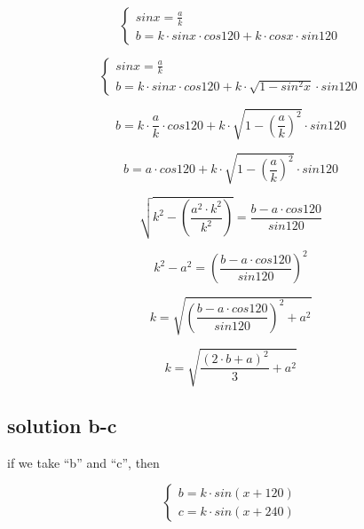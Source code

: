 \documentclass[unicode, 12pt, a4paper]{article}
\begin{document}
\begin{equation}
  \begin{cases}
    sin x = \frac{a}{k}\\
    b = k \cdot sin x \cdot cos 120 + k \cdot cos x \cdot sin 120
  \end{cases}
\end{equation}


\begin{equation}
  \begin{cases}
    sin x = \frac{a}{k}\\
    b = k \cdot sin x \cdot cos 120 + k \cdot \sqrt{1 - sin^2 x} \cdot sin 120
  \end{cases}
\end{equation}


\begin{equation}
  b = k \cdot \frac{a}{k} \cdot cos 120 + k \cdot \sqrt{1 - \left(\frac{a}{k}\right)^2} \cdot sin 120
\end{equation}

\begin{equation}
  b = a \cdot cos 120 + k \cdot \sqrt{1 - \left(\frac{a}{k}\right)^2} \cdot sin 120
\end{equation}

\begin{equation}
  \sqrt{k^2 - \left(\frac{a^2 \cdot k^2}{k^2}\right)} =  \frac{b - a \cdot cos 120}{sin 120}
\end{equation}

\begin{equation}
  k^2 - a^2  =  \left(\frac{b - a \cdot cos 120}{sin 120}\right)^2
\end{equation}

\begin{equation}
  k = \sqrt{\left(\frac{b - a \cdot cos 120}{sin 120}\right)^2 + a^2}
\end{equation}

\begin{equation}
  k = \sqrt{\frac{(2 \cdot b + a)^2}{3} + a^2}
\end{equation}





\subsection{solution b-c}

if we take ``b'' and ``c'', then

\begin{equation}
  \begin{cases}
    b = k \cdot sin(x + 120)\\
    c = k \cdot sin(x + 240)
  \end{cases}
\end{equation}
\end{document}
